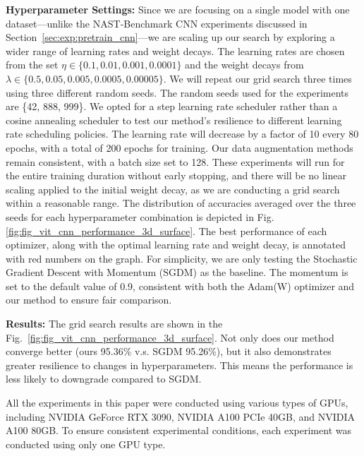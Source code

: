 \textbf{Hyperparameter Settings:} Since we are focusing on a single model with one dataset—unlike the NAST-Benchmark CNN experiments discussed in Section~\ref{sec:exp:pretrain_cnn}—we are scaling up our search by exploring a wider range of learning rates and weight decays. The learning rates are chosen from the set \(\eta \in \{0.1, 0.01, 0.001, 0.0001\}\) and the weight decays from \(\lambda \in \{0.5, 0.05, 0.005, 0.0005, 0.00005\}\). We will repeat our grid search three times using three different random seeds. The random seeds used for the experiments are \{42, 888, 999\}.
We opted for a step learning rate scheduler rather than a cosine annealing scheduler to test our method's resilience to different learning rate scheduling policies. The learning rate will decrease by a factor of 10 every 80 epochs, with a total of 200 epochs for training.
Our data augmentation methods remain consistent, with a batch size set to 128. These experiments will run for the entire training duration without early stopping, and there will be no linear scaling applied to the initial weight decay, as we are conducting a grid search within a reasonable range. 
The distribution of accuracies averaged over the three seeds for each hyperparameter combination is depicted in Fig.\ref{fig:fig_vit_cnn_performance_3d_surface}. The best performance of each optimizer, along with the optimal learning rate and weight decay, is annotated with red numbers on the graph. For simplicity, we are only testing the Stochastic Gradient Descent with Momentum (SGDM) as the baseline. The momentum is set to the default value of 0.9, consistent with both the Adam(W) optimizer and our method to ensure fair comparison.

\textbf{Results: } The grid search results are shown in the Fig.~\ref{fig:fig_vit_cnn_performance_3d_surface}. Not only does our method converge better (ours 95.36\% v.s. SGDM 95.26\%), but it also demonstrates greater resilience to changes in hyperparameters. This means the performance is less likely to downgrade compared to SGDM.

All the experiments in this paper were conducted using various types of GPUs, including NVIDIA GeForce RTX 3090, NVIDIA A100 PCIe 40GB, and NVIDIA A100 80GB. To ensure consistent experimental conditions, each experiment was conducted using only one GPU type.


